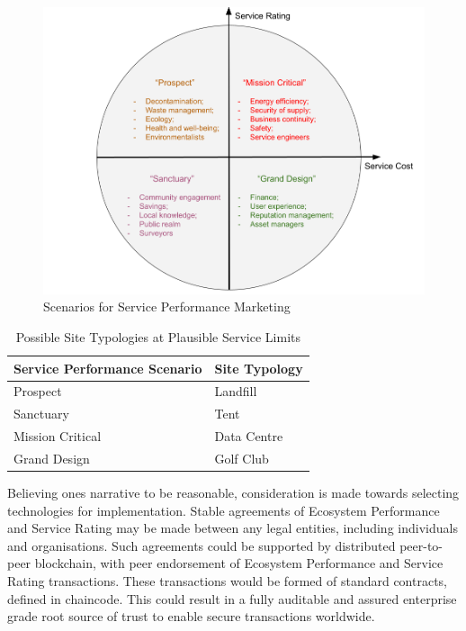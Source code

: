 \documentclass[11pt, oneside]{article}   	%
\begin{document}
\begin{figure}[H]
\centering
\includegraphics[width=1\textwidth]{scenarios}
\caption{Scenarios for Service Performance Marketing}
\label{Scenarios}
\end{figure}

\begin{table}[H]
\caption{Possible Site Typologies at Plausible Service Limits}
\begin{center}
\begin{tabular}{| l | l |}
\hline
Service Performance Scenario&Site Typology\\
\hline
Prospect&Landfill\\
Sanctuary&Tent\\
Mission Critical&Data Centre\\
Grand Design&Golf Club\\
\hline
\end{tabular}
\end{center}
\label{Service limits table}
\end{table}

Believing ones narrative to be reasonable, consideration is made towards selecting technologies for implementation.
Stable agreements of Ecosystem Performance and Service Rating may be made between any legal entities, including individuals and organisations.
Such agreements could be supported by distributed peer-to-peer blockchain, with peer endorsement of Ecosystem Performance and Service Rating transactions.
These transactions would be formed of standard contracts, defined in chaincode.
This could result in a fully auditable and assured enterprise grade root source of trust to enable secure transactions worldwide.\\
\end{document}
